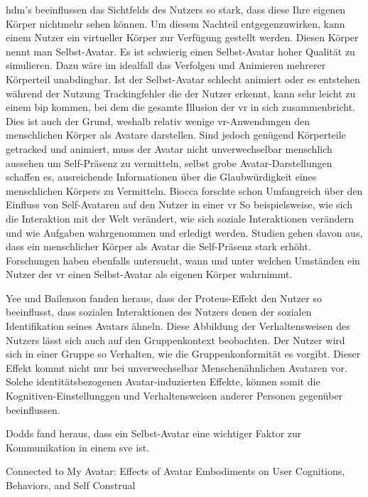 \documentclass[a4paper,11pt]{article}%
\renewcommand{\\}{\vspace*{0.5\baselineskip} \newline}
\begin{document}
\ac{hdm}'s beeinflussen das Sichtfelds des Nutzers so stark, dass diese Ihre eigenen Körper nichtmehr sehen können. Um diesem Nachteil entgegenzuwirken, kann einem Nutzer ein virtueller Körper zur Verfügung gestellt werden. Diesen Körper nennt man Selbst-Avatar.
Es ist schwierig einen Selbst-Avatar hoher Qualität zu simulieren. Dazu wäre im idealfall das Verfolgen und Animieren mehrerer Körperteil unabdingbar. Ist der Selbst-Avatar schlecht animiert oder es entstehen während der Nutzung Trackingfehler die der Nutzer erkennt, kann sehr leicht zu einem \ac{bip} kommen, bei dem die gesamte Illusion der \ac{vr} in sich zusammenbricht. 
Dies ist auch der Grund, weshalb relativ wenige \ac{vr}-Anwendungen den menschlichen Körper als Avatare darstellen.
Sind jedoch genügend Körperteile getracked und animiert, muss der Avatar nicht unverwechselbar menschlich aussehen um Self-Präsenz zu vermitteln, selbst grobe Avatar-Darstellungen schaffen es, ausreichende Informationen über die Glaubwürdigkeit eines menschlichen Körpers zu Vermitteln.\citep{lok2003effects}
Biocca forschte schon Umfangreich über den Einfluss von Self-Avataren auf den Nutzer in einer \ac{vr} \citep[421-427]{construal2014connected} So beispielsweise, wie sich die Interaktion mit der Welt verändert, wie sich soziale Interaktionen verändern und wie Aufgaben wahrgenommen und erledigt werden. \citep{benford1995user} \citep{bowers1996talk}
Studien gehen davon aus, dass ein menschlicher Körper als Avatar die Self-Präsenz stark erhöht.
Forschungen haben ebenfalls untersucht, wann und unter welchen Umständen ein Nutzer der \ac{vr} einen Selbst-Avatar als eigenen Körper wahrnimmt. 

Yee und Bailenson fanden heraus, dass der Proteus-Effekt den Nutzer so beeinflusst, dass sozialen Interaktionen des Nutzers denen der sozialen Identifikation seines Avatars ähneln. \citep{ratan2015leveling} Diese Abbildung der Verhaltensweisen des Nutzers lässt sich auch auf den Gruppenkontext beobachten. Der Nutzer wird sich in einer Gruppe so Verhalten, wie die Gruppenkonformität es vorgibt.
Dieser Effekt kommt nicht nur bei unverwechselbar Menschenähnlichen Avataren vor. \citep{lok2003effects} 
Solche identitätsbezogenen Avatar-induzierten Effekte, können somit die Kognitiven-Einstellunggen und Verhaltensweisen anderer Personen gegenüber beeinflussen.

Dodds fand heraus, dass ein Selbst-Avatar eine wichtiger Faktor zur Kommunikation in einem \ac{sve} ist. \citep[1-11]{dodds2011talk}

Connected to My Avatar:
Effects of Avatar Embodiments on User Cognitions, Behaviors,
and Self Construal 
\end{document}

